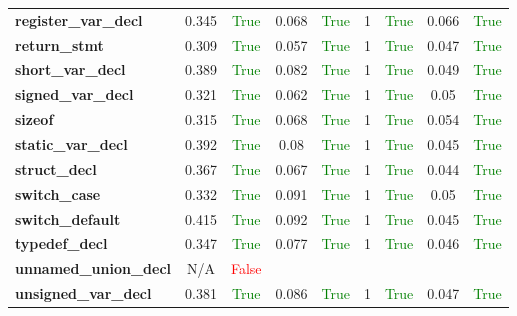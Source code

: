 \documentclass{article}
\begin{document}
\begin{xltabular}{\textwidth}{lcccccccc}
\textbf{{\fontsize{10}{12}\selectfont register\_var\_decl}}& 0.345&\textcolor{green}{True}& 0.068&\textcolor{green}{True}& 1&\textcolor{green}{True}& 0.066&\textcolor{green}{True} \\[0.5ex]
\textbf{{\fontsize{10}{12}\selectfont return\_stmt}}& 0.309&\textcolor{green}{True}& 0.057&\textcolor{green}{True}& 1&\textcolor{green}{True}& 0.047&\textcolor{green}{True} \\[0.5ex]
\textbf{{\fontsize{10}{12}\selectfont short\_var\_decl}}& 0.389&\textcolor{green}{True}& 0.082&\textcolor{green}{True}& 1&\textcolor{green}{True}& 0.049&\textcolor{green}{True} \\[0.5ex]
\textbf{{\fontsize{10}{12}\selectfont signed\_var\_decl}}& 0.321&\textcolor{green}{True}& 0.062&\textcolor{green}{True}& 1&\textcolor{green}{True}& 0.05&\textcolor{green}{True} \\[0.5ex]
\textbf{{\fontsize{10}{12}\selectfont sizeof}}& 0.315&\textcolor{green}{True}& 0.068&\textcolor{green}{True}& 1&\textcolor{green}{True}& 0.054&\textcolor{green}{True} \\[0.5ex]
\textbf{{\fontsize{10}{12}\selectfont static\_var\_decl}}& 0.392&\textcolor{green}{True}& 0.08&\textcolor{green}{True}& 1&\textcolor{green}{True}& 0.045&\textcolor{green}{True} \\[0.5ex]
\textbf{{\fontsize{10}{12}\selectfont struct\_decl}}& 0.367&\textcolor{green}{True}& 0.067&\textcolor{green}{True}& 1&\textcolor{green}{True}& 0.044&\textcolor{green}{True} \\[0.5ex]
\textbf{{\fontsize{10}{12}\selectfont switch\_case}}& 0.332&\textcolor{green}{True}& 0.091&\textcolor{green}{True}& 1&\textcolor{green}{True}& 0.05&\textcolor{green}{True} \\[0.5ex]
\textbf{{\fontsize{10}{12}\selectfont switch\_default}}& 0.415&\textcolor{green}{True}& 0.092&\textcolor{green}{True}& 1&\textcolor{green}{True}& 0.045&\textcolor{green}{True} \\[0.5ex]
\textbf{{\fontsize{10}{12}\selectfont typedef\_decl}}& 0.347&\textcolor{green}{True}& 0.077&\textcolor{green}{True}& 1&\textcolor{green}{True}& 0.046&\textcolor{green}{True} \\[0.5ex]
\textbf{{\fontsize{10}{12}\selectfont unnamed\_union\_decl}}& N/A&\textcolor{red}{False} \\[0.5ex]
\textbf{{\fontsize{10}{12}\selectfont unsigned\_var\_decl}}& 0.381&\textcolor{green}{True}& 0.086&\textcolor{green}{True}& 1&\textcolor{green}{True}& 0.047&\textcolor{green}{True} \\[0.5ex]

\end{xltabular}
\end{document}
